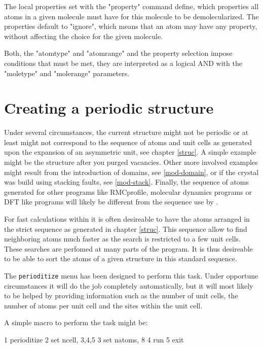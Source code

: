The local properties set with the "property" command define, which properties 
all atoms in a given molecule must have for this molecule to be demolecularized.
The properties default to "ignore", which means that an atom may have any
property, without affecting the choice for the given molecule.

Both, the "atomtype" and "atomrange" and the property selection impose 
conditions that must be met, they
are interpreted as a logical AND with the "moletype" and "molerange" parameters.

\section{Creating a periodic structure \label{mod-per}}

Under several circumstances, the current structure might not be periodic or at least 
might not correspond to the sequence of atoms and unit cells as generated upon the 
expansion of an asymmetric unit, see chapter \ref{struc}. A simple
example might be the structure after you purged vacancies. Other more involved
examples might result from the introduction of domains, see \ref{mod-domain}, or
if the crystal was build using stacking faults, see \ref{mod-stack}. Finally, the 
sequence of atoms generated for other programs like RMCprofile, molecular dynamics 
programs or DFT like programs will likely be different from the sequence use 
by \discus.

For fast calculations within \Discus it is often desireable to have the atoms
arranged in the strict sequence as generated in chapter \ref{struc}. This 
sequence allow \Discus to find neighboring atoms much faster as the search is 
restricted to a few unit cells. These searches are perfomed at many parts of 
the program. It is thus desireable to be able to sort the atoms of a given 
structure in this standard sequence. 

The {\tt perioditize} menu has been designed to perform this task. Under 
opportune circumstances it will do the job completely automatically, but it 
will most likely to 
be helped by providing information such as the number of unit cells, the 
number of atoms per unit cell and the sites within the unit cell.

A simple macro to perform the task might be:

\begin{MacVerbatim}
1  perioditize
2    set ncell, 3,4,5
3    set natoms, 8
4    run
5  exit
\end{MacVerbatim}

